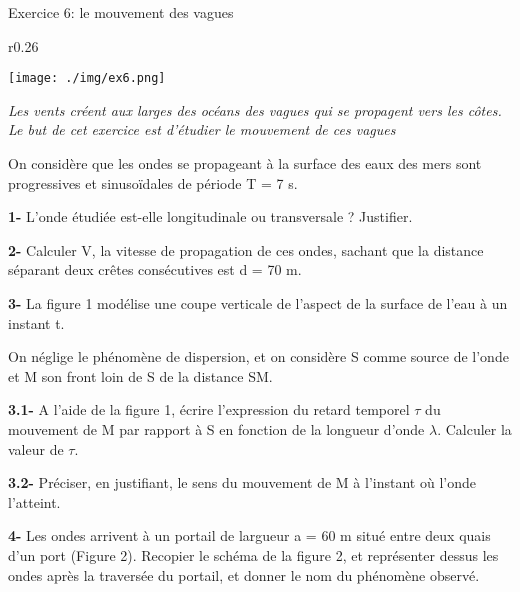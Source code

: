 \documentclass[12pt, french]{article}
\begin{document}
\begin{Box2}{Exercice 6: le mouvement des vagues}

	\begin{wrapfigure}{r}{0.26\textwidth}
  \begin{center}
	\texttt{[image: ./img/ex6.png]}
  \end{center}
\end{wrapfigure}


\emph{Les vents créent aux larges des océans des vagues qui se propagent vers les côtes. Le but de cet exercice
est d’étudier le mouvement de ces vagues}

On considère que les ondes se propageant à la surface des eaux des mers sont progressives et
sinusoïdales de période T = 7 s.

\textbf{1- }L’onde étudiée est-elle longitudinale ou transversale ? Justifier.

\textbf{2- }Calculer V, la vitesse de propagation de ces ondes, sachant
que la distance séparant deux crêtes consécutives est d = 70 m.

\textbf{3- }La figure 1 modélise une coupe verticale de l’aspect de la
surface de l’eau à un instant t.

On néglige le phénomène de dispersion, et on considère S comme
source de l’onde et M son front loin de S de la distance SM.

\textbf{3.1- }A l’aide de la figure 1, écrire l’expression du retard
temporel $\tau$ du mouvement de M par rapport à S en
fonction de la longueur d’onde $\lambda$. Calculer la valeur de $\tau$.

\textbf{3.2- }Préciser, en justifiant, le sens du mouvement de M à
l’instant où l’onde l’atteint.

\textbf{4- }Les ondes arrivent à un portail de largueur a = 60 m situé entre
deux quais d’un port (Figure 2). Recopier le schéma de la figure 2, et représenter dessus les ondes après la traversée du portail, et donner le nom du phénomène observé.



\end{Box2}
\end{document}
